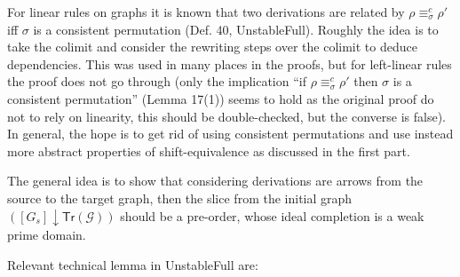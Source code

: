 \documentclass{llncs}
\newcommand{\slice}[2]{\ensuremath{({#1} \downarrow {#2})}}
\newcommand{\tr}[1]{\ensuremath{\mathsf{Tr}({#1})}}
\begin{document}
For linear rules on graphs it is known that two derivations are
related by $\rho \equiv^c_\sigma \rho'$ iff $\sigma$ is a consistent
permutation (Def. 40, UnstableFull). Roughly the idea is to take the colimit
and consider the rewriting steps over the colimit to deduce
dependencies. This was used in many places in the proofs, but for
left-linear rules the proof does not go through (only the implication
``if $\rho \equiv^c_\sigma \rho'$ then $\sigma$ is a consistent
permutation'' (Lemma 17(1)) seems to hold as the original proof do not
to rely on linearity, this should be double-checked, but the converse
is false). In general, the hope is to get rid of using consistent
permutations and use instead more abstract properties of
shift-equivalence as discussed in the first part.

The general idea is to show that considering derivations are arrows from the source to the target graph, then the slice from the initial graph $\slice{[G_s]}{\tr{\mathcal{G}}}$ should be a pre-order, whose ideal completion is a weak prime domain.

Relevant technical lemma in UnstableFull are:
\end{document}
